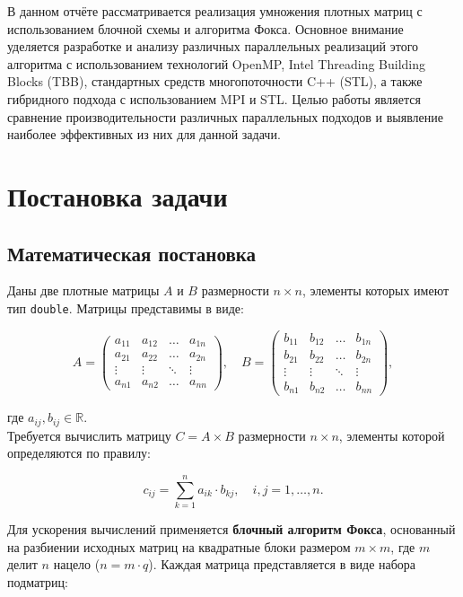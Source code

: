 \documentclass[12pt]{article}
\begin{document}
В данном отчёте рассматривается реализация умножения плотных матриц с использованием блочной схемы и алгоритма Фокса. Основное внимание уделяется разработке и анализу различных параллельных реализаций этого алгоритма с использованием технологий OpenMP, Intel Threading Building Blocks (TBB), стандартных средств многопоточности C++ (STL), а также гибридного подхода с использованием MPI и STL. Целью работы является сравнение производительности различных параллельных подходов и выявление наиболее эффективных из них для данной задачи.

\newpage
\section{Постановка задачи}
\subsection{Математическая постановка}
Даны две плотные матрицы $A$ и $B$ размерности $n \times n$, элементы которых имеют тип \texttt{double}. Матрицы представимы в виде:

\[
A = \begin{pmatrix}
a_{11} & a_{12} & \dots & a_{1n} \\
a_{21} & a_{22} & \dots & a_{2n} \\
\vdots & \vdots & \ddots & \vdots \\
a_{n1} & a_{n2} & \dots & a_{nn}
\end{pmatrix}, \quad
B = \begin{pmatrix}
b_{11} & b_{12} & \dots & b_{1n} \\
b_{21} & b_{22} & \dots & b_{2n} \\
\vdots & \vdots & \ddots & \vdots \\
b_{n1} & b_{n2} & \dots & b_{nn}
\end{pmatrix},
\]

где $a_{ij}, b_{ij} \in \mathbb{R}$.\\

Требуется вычислить матрицу $C = A \times B$ размерности $n \times n$, элементы которой определяются по правилу:

\[
c_{ij} = \sum_{k=1}^{n} a_{ik} \cdot b_{kj}, \quad i, j = 1, \dots, n.
\]

Для ускорения вычислений применяется \textbf{блочный алгоритм Фокса}, основанный на разбиении исходных матриц на квадратные блоки размером $m \times m$, где $m$ делит $n$ нацело ($n = m \cdot q$). Каждая матрица представляется в виде набора подматриц:
\end{document}

